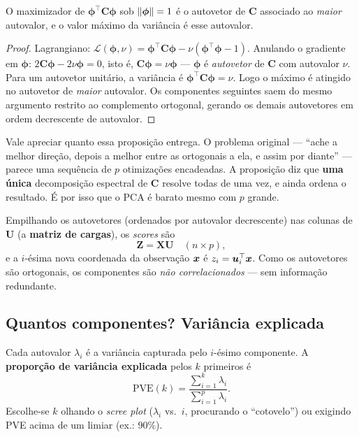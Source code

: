 \documentclass[11pt,a4paper]{article}
\begin{document}
\begin{proposicao}\label{prop:pca}
O maximizador de $\bm{\phi}^\top\bm{C}\bm{\phi}$ sob $\left\lVert \bm{\phi} \right\rVert=1$ é o
autovetor de $\bm{C}$ associado ao \emph{maior} autovalor, e o valor máximo da
variância é esse autovalor.
\end{proposicao}
\begin{proof}
Lagrangiano: $\mathcal{L}(\bm{\phi},\nu)=\bm{\phi}^\top\bm{C}\bm{\phi}
-\nu(\bm{\phi}^\top\bm{\phi}-1)$. Anulando o gradiente em $\bm{\phi}$:
$2\bm{C}\bm{\phi}-2\nu\bm{\phi}=0$, isto é, $\bm{C}\bm{\phi}=\nu\bm{\phi}$ ---
$\bm{\phi}$ é \emph{autovetor} de $\bm{C}$ com autovalor $\nu$. Para um autovetor
unitário, a variância é $\bm{\phi}^\top\bm{C}\bm{\phi}=\nu$. Logo o máximo é atingido
no autovetor de \emph{maior} autovalor. Os componentes seguintes saem do mesmo
argumento restrito ao complemento ortogonal, gerando os demais autovetores em ordem
decrescente de autovalor.
\end{proof}

\begin{ideia}
Vale apreciar quanto essa proposição entrega. O problema original --- ``ache a
melhor direção, depois a melhor entre as ortogonais a ela, e assim por diante''
--- parece uma sequência de $p$ otimizações encadeadas. A proposição diz que
\textbf{uma única} decomposição espectral de $\bm{C}$ resolve todas de uma vez, e
ainda ordena o resultado. É por isso que o PCA é barato mesmo com $p$ grande.
\end{ideia}

Empilhando os autovetores (ordenados por autovalor decrescente) nas colunas de
$\bm{U}$ (a \textbf{matriz de cargas}), os \emph{scores} são
\[
  \bm{Z} = \bm{X}\bm{U}\quad (n\times p),
\]
e a $i$-ésima nova coordenada da observação $\bm{x}$ é $z_{i}=\bm{u}_i^\top\bm{x}$. Como os
autovetores são ortogonais, os componentes são \emph{não correlacionados} --- sem
informação redundante.

\subsection{Quantos componentes? Variância explicada}
Cada autovalor $\lambda_i$ é a variância capturada pelo $i$-ésimo componente. A
\textbf{proporção de variância explicada} pelos $k$ primeiros é
\begin{equation}\label{eq:pve}
  \text{PVE}(k) = \frac{\sum_{i=1}^k \lambda_i}{\sum_{i=1}^p \lambda_i}.
\end{equation}
Escolhe-se $k$ olhando o \emph{scree plot} ($\lambda_i$ vs.\ $i$, procurando o
``cotovelo'') ou exigindo PVE acima de um limiar (ex.: 90\%).
\end{document}
